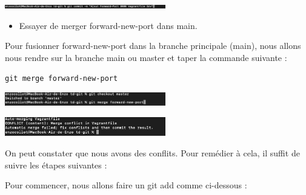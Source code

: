 \documentclass[12pt]{article}
\begin{document}
\vspace{0.3cm}

\begin{center}
  \includegraphics[width=7cm]{Images-TD-Git/Image-TD-Git-4/commit-2.png}
\end{center}

\vspace{0.3cm}

\newpage

\vspace{0.3cm}

\begin{itemize}
  \item Essayer de merger forward-new-port dans main.
\end{itemize}

\vspace{0.3cm}

Pour fusionner forward-new-port dans la branche principale (main), nous allons nous rendre sur la branche main ou master et taper la commande suivante :

\texttt{git merge forward-new-port}

\vspace{0.3cm}

\begin{center}
  \includegraphics[width=7cm]{Images-TD-Git/Image-TD-Git-4/git-merge.png}
\end{center}

\vspace{0.3cm}

\begin{center}
  \includegraphics[width=7cm]{Images-TD-Git/Image-TD-Git-4/Conflits.png}
\end{center}

\vspace{0.3cm}

On peut constater que nous avons des conflits. Pour remédier à cela, il suffit de suivre les étapes suivantes :

\vspace{0.3cm}

Pour commencer, nous allons faire un git add comme ci-dessous :
\end{document}
